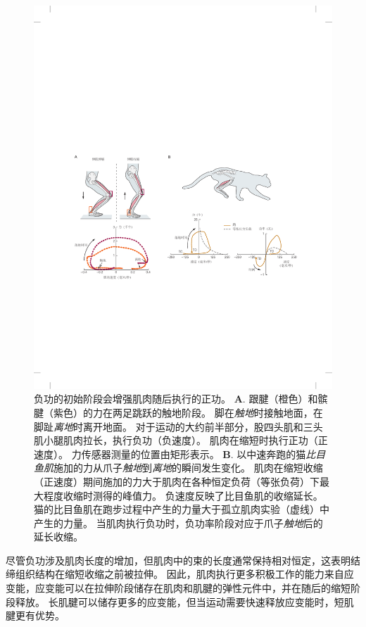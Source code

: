 \begin{figure}[htbp]
	\centering
	\includegraphics[width=1.0\linewidth]{chap31/fig_31_17}
	\caption{负功的初始阶段会增强肌肉随后执行的正功\cite{finni2000vivo,gregor1988mechanical}。
	\textbf{A}. 跟腱（橙色）和髌腱（紫色）的力在两足跳跃的触地阶段。
	脚在\textit{触地}时接触地面，在脚趾\textit{离地}时离开地面。
	对于运动的大约前半部分，股四头肌和三头肌小腿肌肉拉长，执行负功（负速度）。
	肌肉在缩短时执行正功（正速度）。
	力传感器测量的位置由矩形表示。
	\textbf{B}. 以中速奔跑的猫\textit{比目鱼肌}施加的力从爪子\textit{触地}到\textit{离地}的瞬间发生变化。
	肌肉在缩短收缩（正速度）期间施加的力大于肌肉在各种恒定负荷（等张负荷）下最大程度收缩时测得的峰值力。
	负速度反映了比目鱼肌的收缩延长。
	猫的比目鱼肌在跑步过程中产生的力量大于孤立肌肉实验（虚线）中产生的力量。
	当肌肉执行负功时，负功率阶段对应于爪子\textit{触地}后的延长收缩。}
	\label{fig:31_17}
\end{figure}


尽管负功涉及肌肉长度的增加，但肌肉中的束的长度通常保持相对恒定，这表明结缔组织结构在缩短收缩之前被拉伸。
因此，肌肉执行更多积极工作的能力来自应变能，应变能可以在拉伸阶段储存在肌肉和肌腱的弹性元件中，并在随后的缩短阶段释放。
长肌腱可以储存更多的应变能，但当运动需要快速释放应变能时，短肌腱更有优势。



